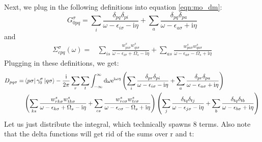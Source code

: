 \documentclass[12pt]{article}
\begin{document}
Next, we plug in the following definitions into equation \ref{eqn:mo_dm}:
\begin{equation}
G_{0 p q}^\sigma=\sum_i \frac{\delta_{p q} \delta_{p i}}{\omega-\epsilon_{i \sigma}-\mathrm{i} \eta}+\sum_a \frac{\delta_{p q} \delta_{p a}}{\omega-\epsilon_{a \sigma}+\mathrm{i} \eta}
\end{equation}
and
\begin{equation}
\begin{aligned}
\Sigma_{c p q}^\sigma(\omega)= & \sum_{i s} \frac{w_{p i \sigma}^s w_{q i \sigma}^s}{\omega-\epsilon_{i \sigma}+\Omega_s-\mathrm{i} \eta} +\sum_{a s} \frac{w_{p a \sigma}^s w_{q a \sigma}^s}{\omega-\epsilon_{a \sigma}-\Omega_s+\mathrm{i} \eta}
\end{aligned}
\end{equation}
Plugging in these definitions, we get:
\begin{equation}
\begin{aligned}
D_{p q \sigma}= & \bra{p\sigma } \gamma _0^\sigma \ket{q\sigma } -\frac{\mathrm{i }}{2 \pi} \sum_{r} \sum_{t} \int_{-\infty }^{\infty } \mathrm{d} \omega \mathrm{e}^{\mathrm{i \omega \eta}} \left( \sum_i \frac{\delta_{p r} \delta_{p i}}{\omega-\epsilon_{i \sigma}-\mathrm{i} \eta}+\sum_a \frac{\delta_{p r} \delta_{p a}}{\omega-\epsilon_{a \sigma}+\mathrm{i} \eta} \right)\\
& \left( \sum_{k s} \frac{w_{r k \sigma}^s w_{t k \sigma}^s}{\omega-\epsilon_{k \sigma}+\Omega_s-\mathrm{i} \eta} +\sum_{c s} \frac{w_{r c \sigma}^s w_{t c \sigma}^s}{\omega-\epsilon_{c \sigma}-\Omega_s+\mathrm{i} \eta} \right) \left( \sum_j \frac{\delta_{t q} \delta_{t j}}{\omega-\epsilon_{j \sigma}-\mathrm{i} \eta}+\sum_b \frac{\delta_{t q} \delta_{t b}}{\omega-\epsilon_{b \sigma}+\mathrm{i} \eta} \right)
\end{aligned}
\end{equation}
Let us just distribute the integral, which technically spawns 8 terms. Also note that the delta functions will get rid of the sums over r and t:
\end{document}
